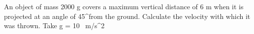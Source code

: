 \documentclass[preview]{standalone}
\begin{document}
\begin{center}
An object of mass 2000 g covers a maximum vertical distance of 6 m when it is projected at an angle of 45^\circ from the ground. Calculate the velocity with which it was thrown. Take g = 10 \, m/s^2
\end{center}
\end{document}

